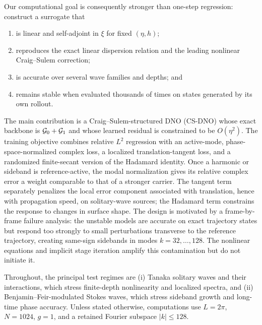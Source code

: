 Our computational goal is consequently stronger than one-step regression:
construct a surrogate that
\begin{enumerate}
  \item is linear and self-adjoint in $\xi$ for fixed $(\eta,h)$;
  \item reproduces the exact linear dispersion relation and the leading
        nonlinear Craig--Sulem correction;
  \item is accurate over several wave families and depths; and
  \item remains stable when evaluated thousands of times on states generated
        by its own rollout.
\end{enumerate}

The main contribution is a Craig--Sulem-structured DNO (CS-DNO) whose exact
backbone is $\mathcal{G}_0+\mathcal{G}_1$ and whose learned residual is constrained to be
$O(\eta^2)$.  The training objective combines relative $L^2$ regression with
an active-mode, phase-space-normalized complex loss, a localized
translation-tangent loss, and a randomized finite-secant version of the
Hadamard identity. Once a harmonic or sideband is reference-active, the modal
normalization gives its relative complex error a weight comparable to that of
a stronger carrier. The tangent term separately penalizes the local
error component associated with translation, hence with propagation speed,
on solitary-wave sources; the Hadamard term constrains the response to
changes in surface shape. The design is motivated by a frame-by-frame failure
analysis: the unstable models are accurate on exact trajectory states but
respond too strongly to small perturbations transverse to the reference
trajectory, creating same-sign sidebands in modes $k=32,\ldots,128$. The
nonlinear equations and implicit stage iteration amplify this contamination
but do not initiate it.

Throughout, the principal test regimes are (i) Tanaka solitary waves and
their interactions, which stress finite-depth nonlinearity and localized
spectra, and (ii) Benjamin--Feir-modulated Stokes waves, which stress sideband
growth and long-time phase accuracy. Unless stated otherwise, computations
use $L=2\pi$, $N=1024$, $g=1$, and a retained Fourier subspace
$|k|\leq128$.
